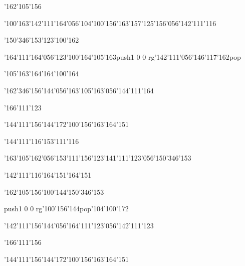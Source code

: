 \null\vfill\ipa\centerline{\enskip\char'162\char'105\char'156\enskip\enskip\enskip\enskip\enskip\enskip\enskip}\medskip\centerline{\enskip\char'100\char'163\enskip\enskip\enskip\char'142\char'111\char'164\char'056\char'104\char'100\char'156\enskip\char'163\char'157\char'125\char'156\char'056\char'142\char'111\char'116}\medskip\centerline{\enskip\char'150\char'346\char'153\enskip\enskip\enskip\enskip\enskip\enskip\enskip\enskip\enskip\enskip\char'123\char'100\char'162}\medskip\centerline{\enskip\char'164\char'111\char'164\char'056\char'123\char'100\char'164\enskip\char'105\char'163\enskip\pdfcolorstack\match push{1 0 0 rg}\char'142\char'111\char'056\char'146\char'117\char'162\pdfcolorstack\match pop{}}\medskip\centerline{\enskip\char'105\char'163\char'164\enskip\enskip\enskip\enskip\enskip\enskip\enskip\char'164\char'100\char'164}\medskip\centerline{\enskip\enskip\enskip\enskip\enskip\char'162\char'346\char'156\char'144\char'056\char'163\char'105\char'163\char'056\char'144\char'111\char'164}\medskip\centerline{\enskip\enskip\enskip\enskip\enskip\enskip\enskip\enskip\enskip\enskip\enskip\char'166\char'111\char'123}\medskip\centerline{\enskip\enskip\enskip\enskip\enskip\char'144\char'111\char'156\char'144\char'172\enskip\char'100\char'156\enskip\enskip\enskip\char'163\char'164\char'151}\medskip\vfill\footline{\hfil\tt\folio\hfil}\eject
\null\vfill\ipa\centerline{\enskip\char'144\char'111\char'116\enskip\enskip\enskip\enskip\char'153\char'111\char'116}\medskip\centerline{\enskip\enskip\enskip\enskip\enskip\enskip\char'163\char'105\char'162\char'056\char'153\char'111\char'156\enskip\char'123\char'141\char'111\char'123\char'056\char'150\char'346\char'153}\medskip\centerline{\enskip\char'142\char'111\char'116\enskip\enskip\enskip\enskip\char'164\char'151\enskip\char'164\char'151\enskip\enskip\enskip\enskip}\medskip\centerline{\enskip\enskip\enskip\enskip\char'162\char'105\char'156\enskip\char'100\char'144\enskip\enskip\enskip\char'150\char'346\char'153}\medskip\centerline{\enskip\pdfcolorstack\match push{1 0 0 rg}\char'100\char'156\char'144\pdfcolorstack\match pop{}\enskip\enskip\enskip\enskip\enskip\enskip\enskip\char'104\char'100\char'172}\medskip\centerline{\enskip\enskip\enskip\enskip\enskip\char'142\char'111\char'156\char'144\char'056\char'164\char'111\char'123\char'056\char'142\char'111\char'123}\medskip\centerline{\enskip\enskip\enskip\enskip\enskip\enskip\enskip\enskip\enskip\enskip\enskip\char'166\char'111\char'156}\medskip\centerline{\enskip\enskip\enskip\enskip\enskip\char'144\char'111\char'156\char'144\char'172\enskip\char'100\char'156\enskip\enskip\enskip\char'163\char'164\char'151}\medskip\vfill\footline{\hfil\tt\folio\hfil}\eject

